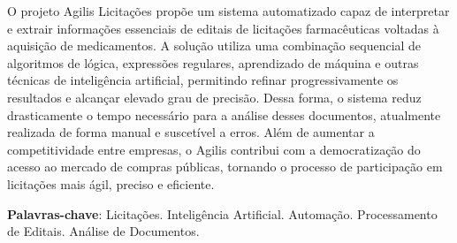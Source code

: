 
\setlength{\absparsep}{18pt} %
\begin{resumo}
O projeto Agilis Licitações propõe um sistema automatizado capaz de interpretar e extrair informações essenciais de editais de licitações farmacêuticas voltadas à aquisição de medicamentos. A solução utiliza uma combinação sequencial de algoritmos de lógica, expressões regulares, aprendizado de máquina e outras técnicas de inteligência artificial, permitindo refinar progressivamente os resultados e alcançar elevado grau de precisão. Dessa forma, o sistema reduz drasticamente o tempo necessário para a análise desses documentos, atualmente realizada de forma manual e suscetível a erros. Além de aumentar a competitividade entre empresas, o Agilis contribui com a democratização do acesso ao mercado de compras públicas, tornando o processo de participação em licitações mais ágil, preciso e eficiente.

\textbf{Palavras-chave}: Licitações. Inteligência Artificial. Automação. Processamento de Editais. Análise de Documentos.
\end{resumo}
